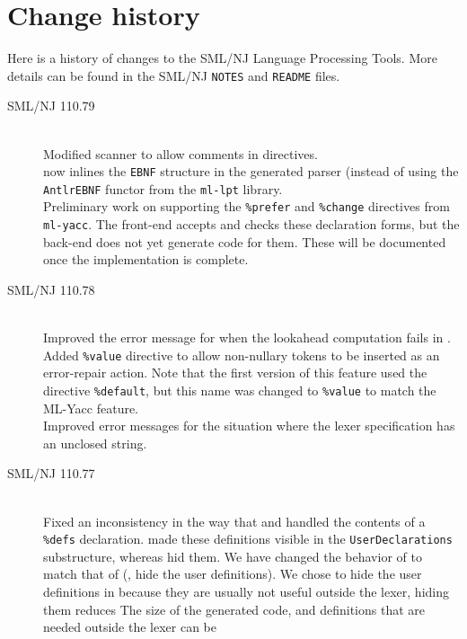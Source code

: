 %
\chapter{Change history}
\label{ch:history}

Here is a history of changes to the SML/NJ Language Processing Tools.
More details can be found in the SML/NJ \texttt{NOTES} and \texttt{README} files.
\begin{description}
  \item[SML/NJ 110.79]
    \mbox{}\\[0.5em]
    Modified scanner to allow comments in \ulex{} directives.
    \\[0.5em]
    \mlantlr{} now inlines the \texttt{EBNF} structure in the generated parser (instead of using
    the \texttt{AntlrEBNF} functor from the \texttt{ml-lpt} library.
    \\[0.5em]
    Preliminary work on supporting the \texttt{\%prefer} and \texttt{\%change} directives
    from \texttt{ml-yacc}.  The front-end accepts and checks these declaration forms, but
    the back-end does not yet generate code for them.  These will be documented once the
    implementation is complete.
%
  \item[SML/NJ 110.78]
    \mbox{}\\[0.5em]
    Improved the error message for when the lookahead computation fails in \mlantlr{}.
    \\[0.5em]
    Added \texttt{\%value} directive to allow non-nullary tokens to be inserted as
    an error-repair action.
    Note that the first version of this feature used the directive \texttt{\%default}, but
    this name was changed to \texttt{\%value} to match the ML-Yacc feature.
    \\[0.5em]
    Improved error messages for the situation where the lexer specification has an unclosed string.
%
  \item[SML/NJ 110.77]
    \mbox{}\\[0.5em]
    Fixed an inconsistency in the way that \mlantlr{} and \ulex{} handled the contents of
    a \texttt{\%defs} declaration.  \ulex{} made these definitions visible in the \texttt{UserDeclarations}
    substructure, whereas \mlantlr{} hid them.  We have changed the behavior of \ulex{} to match
    that of \mlantlr{} (\ie{}, hide the user definitions).  We chose to hide the user definitions
    in \ulex{} because they are usually not useful outside the lexer, hiding them reduces The
    size of the generated code, and definitions that are needed outside the lexer can be

\end{description}
